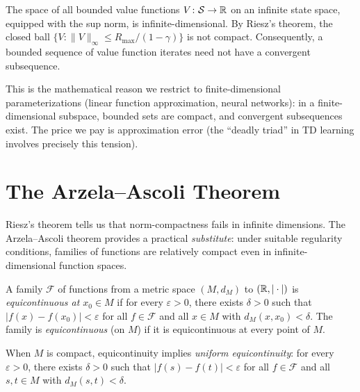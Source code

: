 \documentclass[11pt,a4paper]{article}
\begin{document}
\begin{rlconnection}[title={Why We Need Function Approximation}]
The space of all bounded value functions $V \colon \mathcal{S} \to \mathbb{R}$ on an
infinite state space, equipped with the sup norm, is infinite-dimensional. By
Riesz's theorem, the closed ball $\{V : \|V\|_\infty \le R_{\max}/(1-\gamma)\}$
is not compact. Consequently, a bounded sequence of value function iterates
need not have a convergent subsequence.

This is the mathematical reason we restrict to finite-dimensional
parameterizations (linear function approximation, neural networks): in a
finite-dimensional subspace, bounded sets are compact, and convergent
subsequences exist. The price we pay is approximation error (the ``deadly
triad'' in TD learning involves precisely this tension).
\end{rlconnection}


\section{The Arzela--Ascoli Theorem}
\label{sec:arzela_ascoli}

Riesz's theorem tells us that norm-compactness fails in infinite dimensions.
The Arzela--Ascoli theorem provides a practical \emph{substitute}: under
suitable regularity conditions, families of functions are relatively compact
even in infinite-dimensional function spaces.

\begin{definition}[Equicontinuity]
\label{def:equicontinuous}
A family $\mathcal{F}$ of functions from a metric space $(M, d_M)$ to
$(\mathbb{R}, |\cdot|)$ is \emph{equicontinuous at $x_0 \in M$} if for every
$\varepsilon > 0$, there exists $\delta > 0$ such that
$|f(x) - f(x_0)| < \varepsilon$ for all $f \in \mathcal{F}$ and all
$x \in M$ with $d_M(x, x_0) < \delta$. The family is \emph{equicontinuous}
(on $M$) if it is equicontinuous at every point of $M$.

When $M$ is compact, equicontinuity implies \emph{uniform equicontinuity}:
for every $\varepsilon > 0$, there exists $\delta > 0$ such that
$|f(s) - f(t)| < \varepsilon$ for all $f \in \mathcal{F}$ and all
$s, t \in M$ with $d_M(s, t) < \delta$.
\end{definition}
\end{document}
